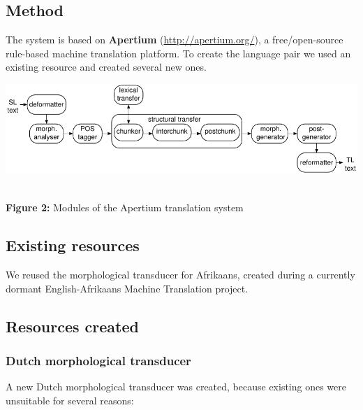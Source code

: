 \documentclass[a0,landscape]{a0poster}
\begin{document}
\begin{multicols}{4}

\section{Method}

\noindent
The system is based on {\bf Apertium} (\url{http://apertium.org/}), a free/open-source rule-based
machine translation platform. To create the language pair we used an existing resource and created 
several new ones. \\

\begin{center}
\begin{minipage}[b]{26cm}
\includegraphics[width=260mm]{apertium2.pdf}
\end{minipage}\\
\textbf{Figure 2:} Modules of the Apertium translation system
\vspace{0.3cm}
\end{center}


\vspace{0.5cm}

\subsection{Existing resources}

\noindent
We reused the morphological transducer for Afrikaans, created during a currently dormant English-Afrikaans
Machine Translation project.\\

\subsection{Resources created}

\subsubsection{Dutch morphological transducer}
A new Dutch morphological transducer was created, because existing ones were unsuitable for several reasons:


\end{multicols}
\end{document}
